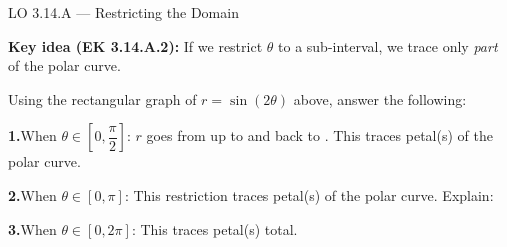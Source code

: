 \documentclass[10pt]{article}
\begin{document}
\vspace{0.08in}

\begin{notesbox}{LO 3.14.A --- Restricting the Domain}

\textbf{Key idea (EK 3.14.A.2):} If we restrict $\theta$ to a sub-interval, we trace
only \emph{part} of the polar curve.

\vspace{6pt}
Using the rectangular graph of $r = \sin(2\theta)$ above, answer the following:

\vspace{4pt}
\textbf{1.}\quad When $\theta \in \left[0, \dfrac{\pi}{2}\right]$:
$r$ goes from \underline{\hspace{0.8cm}} up to \underline{\hspace{0.8cm}} and back
to \underline{\hspace{0.8cm}}.
This traces \underline{\hspace{0.8cm}} petal(s) of the polar curve.

\vspace{4pt}
\textbf{2.}\quad When $\theta \in [0, \pi]$:
This restriction traces \underline{\hspace{0.8cm}} petal(s) of the polar curve.
Explain: \writeline

\vspace{4pt}
\textbf{3.}\quad When $\theta \in [0, 2\pi]$:
This traces \underline{\hspace{0.8cm}} petal(s) total.

\end{notesbox}

\vspace{0.08in}
\end{document}
